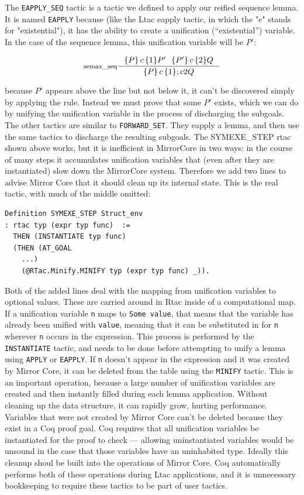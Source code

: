 \documentclass{puthesis}
\begin{document}
The \lstinline|EAPPLY_SEQ| tactic is a tactic we defined to apply our
reified sequence lemma. It is named \lstinline|EAPPLY| because (like
the Ltac eapply tactic, in which the "e" stands for "existential"), it has
the ability to create a unification (``existential'') variable. In the case of the
sequence lemma, this unification variable will be $P'$:

\[
\inference[semax\_seq]{\triple{P}c1{P'} ~~ \triple{P'}c2{Q}}
{\triple{P}c1;c2{Q}}\]

\noindent because $P'$ appears above the line but not below it, it
can't be discovered simply by applying the rule. Instead we must prove
that some $P'$ exists, which we can do by unifying the unification
variable in the process of discharging the subgoals. The other tactics
are similar to \lstinline|FORWARD_SET|. They eapply a lemma, and then
use the same tactics to discharge the resulting subgoals.  The
SYMEXE_STEP rtac shown above works, but it is inefficient in
MirrorCore in two ways: in the course of many steps it
accumulates unification variables that (even after they are
instantiated) slow down the MirrorCore system.  Therefore we add
two lines to advise Mirror Core that it should clean up its internal
state.  This is the real tactic, with much of the middle omitted:

\begin{lstlisting}
Definition SYMEXE_STEP Struct_env
: rtac typ (expr typ func)  :=
  THEN (INSTANTIATE typ func)
  (THEN (AT_GOAL
    ...) 
    (@RTac.Minify.MINIFY typ (expr typ func) _)).
\end{lstlisting}


Both of the added lines deal with the mapping from unification variables to
optional values. These are carried around in Rtac inside of a
computational map. If a unification variable \lstinline|n| maps to
\lstinline|Some value|, that means that the variable has already been
unified with \lstinline|value|, meaning that it can be substituted in
for \lstinline|n| wherever \lstinline|n| occurs in the
expression. This process is performed by the \lstinline|INSTANTIATE|
tactic, and needs to be done before attempting to unify a lemma using
\lstinline|APPLY| or \lstinline|EAPPLY|. If \lstinline|n| doesn't
appear in the expression and it was created by Mirror Core, it can be
deleted from the table using the \lstinline|MINIFY| tactic. This is an
important operation, because a large number of unification variables
are created and then instantly filled during each lemma
application. Without cleaning up the data structure, it can rapidly
grow, hurting performance. Variables that were not created by Mirror
Core can't be deleted because they exist in a Coq proof goal. Coq
requires that all unification variables be instantiated for the proof
to check --- allowing uninstantiated variables would be unsound in
the case that those variables have an uninhabited type. Ideally this
cleanup shoul be built into the operations
of Mirror Core. Coq automatically performs both of these operations
during Ltac applications, and it is unnecessary bookkeeping to require
these tactics to be part of user tactics.
\end{document}

